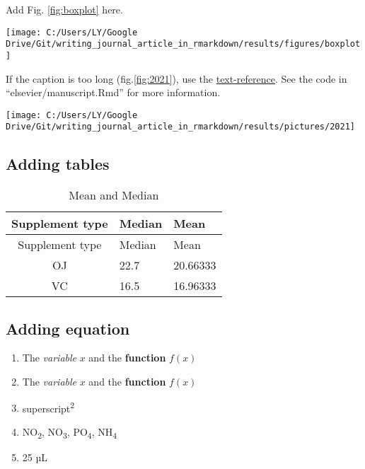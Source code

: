 \documentclass[review]{elsarticle} %
\providecommand{\tightlist}{%
  \setlength{\itemsep}{0pt}\setlength{\parskip}{0pt}}
\let\origfigure\figure
\let\endorigfigure\endfigure
\renewenvironment{figure}[1][2] {
    \expandafter\origfigure\expandafter[H]
} {
    \endorigfigure
}
\begin{document}
Add Fig. \ref{fig:boxplot} here.

\begin{figure}

{\centering \texttt{[image: C:/Users/LY/Google Drive/Git/writing\_journal\_article\_in\_rmarkdown/results/figures/boxplot]} 

}

\caption{A boxplot}\label{fig:boxplot}
\end{figure}

If the caption is too long (fig.\ref{fig:2021}), use the
\href{https://bookdown.org/yihui/rmarkdown/bookdown-markdown.html\#text-references}{text-reference}.
See the code in ``elsevier/manuscript.Rmd'' for more information.



\begin{figure}

{\centering \texttt{[image: C:/Users/LY/Google Drive/Git/writing\_journal\_article\_in\_rmarkdown/results/pictures/2021]} 

}

\caption{This is a very long caption}\label{fig:2021}
\end{figure}

\subsection{Adding tables}\label{table}

\begin{longtable}[]{@{}cll@{}}
\caption{\label{tab:unnamed-chunk-2}\label{tab:cooltable}Mean and
Median}\tabularnewline
\toprule
Supplement type & Median & Mean\tabularnewline
\midrule
\endfirsthead
\toprule
Supplement type & Median & Mean\tabularnewline
\midrule
\endhead
OJ & 22.7 & 20.66333\tabularnewline
VC & 16.5 & 16.96333\tabularnewline
\bottomrule
\end{longtable}

\subsection{Adding equation}\label{equation}

\begin{enumerate}
\def\labelenumi{\arabic{enumi}.}
\tightlist
\item
  The \emph{variable} \(x\) and the \textbf{function} \(f(x)\)
\item
  The \emph{variable} \(x\) and the \textbf{function} \(f(x)\)
\item
  superscript\textsuperscript{2}
\item
  NO\textsubscript{2}, NO\textsubscript{3}, PO\textsubscript{4},
  NH\textsubscript{4}
\item
  25 µL
\end{enumerate}
\end{document}
